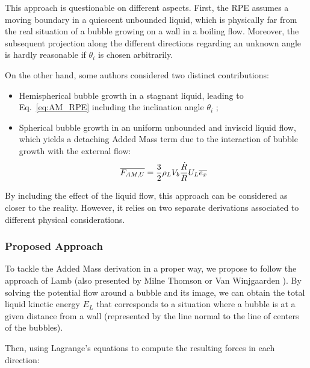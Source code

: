 This approach is questionable on different aspects. First, the RPE assumes a moving boundary in a quiescent unbounded liquid, which is physically far from the real situation of a bubble growing on a wall in a boiling flow. Moreover, the subsequent projection along the different directions regarding an unknown angle is hardly reasonable if $\theta_{i}$ is chosen arbitrarily.



On the other hand, some authors \cite{klausner_vapor_1993, thorncroft_bubble_2001, guan_bubble_2015} considered two distinct contributions: 

\begin{itemize}

\item Hemispherical bubble growth in a stagnant liquid, leading to Eq.~\ref{eq:AM_RPE} including the inclination angle $\theta_{i}$ ;
\item Spherical bubble growth in an uniform unbounded and inviscid liquid flow, which yields a detaching Added Mass term  due to the interaction of bubble growth with the external flow: 
\begin{equation}
\overline{F_{AM,U}}= \frac{3}{2}\rho_{L}V_{b}\frac{\dot{R}}{R}U_{L} \overline{e_{x}} 
\label{eq:AM_bulk}
\end{equation} 

\end{itemize}

By including the effect of the liquid flow, this approach can be considered as closer to the reality. However, it relies on two separate derivations associated to different physical considerations.

\subsubsection{Proposed Approach}
\label{subsubsec:new_AM}

To tackle the Added Mass derivation in a proper way, we propose to follow the approach of Lamb \cite{lamb_hydrodynamics_1895} (also presented by Milne Thomson \cite{milne-thomson_theoretical_1938} or Van Winjgaarden \cite{wijngaarden_hydrodynamic_1976}). By solving the potential flow around a bubble and its image, we can obtain the total liquid kinetic energy $E_{L}$ that corresponds to a situation where a bubble is at a given distance from a wall (represented by the line normal to the line of centers of the bubbles). 

Then, using Lagrange's equations to compute the resulting forces in each direction:


